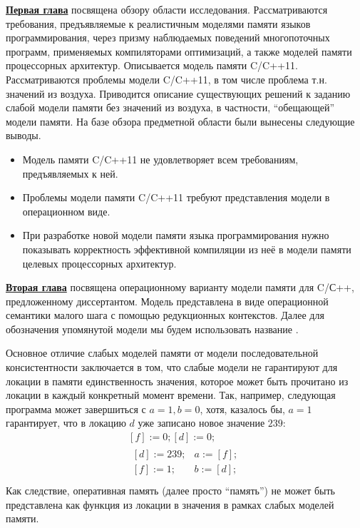 \underline{\textbf{Первая глава}} посвящена обзору области исследования.
Рассматриваются требования, предъявляемые к реалистичным моделями памяти
языков программирования, через призму наблюдаемых поведений многопоточных программ,
применяемых компиляторами оптимизаций, а также моделей памяти процессорных архитектур.
Описывается модель памяти C/C++11. Рассматриваются проблемы модели C/C++11, в том числе
проблема т.н. значений из воздуха. Приводится описание существующих решений к заданию
слабой модели памяти без значений из воздуха, в частности, ``обещающей'' модели памяти.
На базе обзора предметной области были вынесены следующие выводы.
\begin{itemize}
  \item Модель памяти C/C++11 не удовлетворяет всем требованиям, предъявляемых к ней.
  \item Проблемы модели памяти C/C++11 требуют представления модели в операционном виде.
  \item При разработке новой модели памяти языка программирования нужно показывать корректность эффективной компиляции
    из неё в модели памяти целевых процессорных архитектур.
\end{itemize}

\underline{\textbf{Вторая глава}} посвящена операционному варианту модели памяти для C/С++,
предложенному диссертантом. Модель представлена в виде операционной семантики малого шага с помощью редукционных
контекстов. Далее для обозначения упомянутой модели мы будем использовать название \OpCpp.

Основное отличие слабых моделей памяти от модели последовательной консистентности заключается в том, что
слабые модели не гарантируют для локации в памяти единственность значения, которое может быть прочитано из локации
в каждый конкретный момент времени.
Так, например, следующая программа может завершиться с $a = 1, b = 0$, хотя, казалось бы, $a = 1$ гарантирует, что
в локацию $d$ уже записано новое значение $239$:
\[
\begin{array}{c}
[f] := 0; [d] := 0; \\
\begin{array}{l||l}
  {} [d] := 239; & a := [f]; \\
  {} [f] := 1;   & b := [d]; \\
\end{array}
\end{array}
\]
Как следствие, оперативная память (далее просто ``память'') не может быть представлена как функция из локации в значения в рамках слабых моделей памяти.


